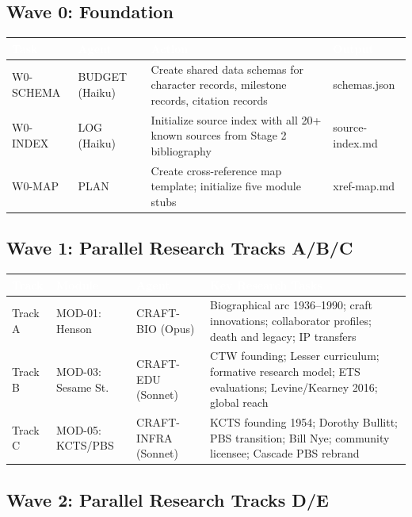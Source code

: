 \documentclass[11pt,letterpaper]{article}
\newcommand{\tableheader}[1]{\textbf{\sffamily\textcolor{white}{#1}}}
\begin{document}
\subsection{Wave 0: Foundation}

\begin{center}
\begin{tabularx}{\textwidth}{L{2cm}L{2.5cm}XL{2.5cm}}
\toprule
{}
\tableheader{Task} & \tableheader{Agent} & \tableheader{Action} & \tableheader{Output} \\
\midrule
W0-SCHEMA & BUDGET (Haiku) & Create shared data schemas for character records, milestone records, citation records & schemas.json \\
W0-INDEX & LOG (Haiku) & Initialize source index with all 20+ known sources from Stage 2 bibliography & source-index.md \\
W0-MAP & PLAN & Create cross-reference map template; initialize five module stubs & xref-map.md \\
\bottomrule
\end{tabularx}
\end{center}

\subsection{Wave 1: Parallel Research Tracks A/B/C}

\begin{center}
\begin{tabularx}{\textwidth}{L{1.5cm}L{2.5cm}L{2.5cm}X}
\toprule
{}
\tableheader{Track} & \tableheader{Module} & \tableheader{Agent} & \tableheader{Key Research Tasks} \\
\midrule
Track A & MOD-01: Henson & CRAFT-BIO (Opus) & Biographical arc 1936--1990; craft innovations; collaborator profiles; death and legacy; IP transfers \\
Track B & MOD-03: Sesame St. & CRAFT-EDU (Sonnet) & CTW founding; Lesser curriculum; formative research model; ETS evaluations; Levine/Kearney 2016; global reach \\
Track C & MOD-05: KCTS/PBS & CRAFT-INFRA (Sonnet) & KCTS founding 1954; Dorothy Bullitt; PBS transition; Bill Nye; community licensee; Cascade PBS rebrand \\
\bottomrule
\end{tabularx}
\end{center}

\subsection{Wave 2: Parallel Research Tracks D/E}
\end{document}

